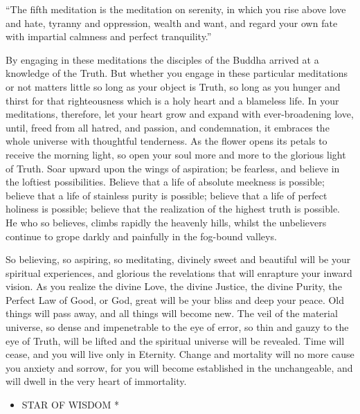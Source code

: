 \documentclass[12pt,oneside]{scrbook}
\begin{document}
  ``The fifth meditation is the meditation on serenity, in which you rise
  above love and hate, tyranny and oppression, wealth and want, and regard
  your own fate with impartial calmness and perfect tranquility.''
  
  By engaging in these meditations the disciples of the Buddha arrived at
  a knowledge of the Truth. But whether you engage in these particular
  meditations or not matters little so long as your object is Truth, so
  long as you hunger and thirst for that righteousness which is a holy
  heart and a blameless life. In your meditations, therefore, let your
  heart grow and expand with ever-broadening love, until, freed from all
  hatred, and passion, and condemnation, it embraces the whole universe
  with thoughtful tenderness. As the flower opens its petals to receive
  the morning light, so open your soul more and more to the glorious light
  of Truth. Soar upward upon the wings of aspiration; be fearless, and
  believe in the loftiest possibilities. Believe that a life of absolute
  meekness is possible; believe that a life of stainless purity is
  possible; believe that a life of perfect holiness is possible; believe
  that the realization of the highest truth is possible. He who so
  believes, climbs rapidly the heavenly hills, whilst the unbelievers
  continue to grope darkly and painfully in the fog-bound valleys.
  
  So believing, so aspiring, so meditating, divinely sweet and beautiful
  will be your spiritual experiences, and glorious the revelations that
  will enrapture your inward vision. As you realize the divine Love, the
  divine Justice, the divine Purity, the Perfect Law of Good, or God,
  great will be your bliss and deep your peace. Old things will pass away,
  and all things will become new. The veil of the material universe, so
  dense and impenetrable to the eye of error, so thin and gauzy to the eye
  of Truth, will be lifted and the spiritual universe will be revealed.
  Time will cease, and you will live only in Eternity. Change and
  mortality will no more cause you anxiety and sorrow, for you will become
  established in the unchangeable, and will dwell in the very heart of
  immortality.
  
  \begin{itemize}
  \itemsep1pt\parskip0pt
  \item
    STAR OF WISDOM *
  \end{itemize}
  
\end{document}
